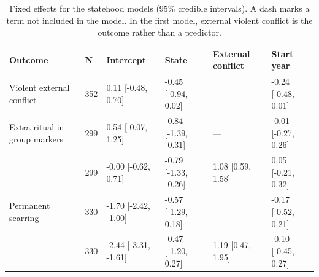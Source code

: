 \begin{table}[!ht]
\centering
\footnotesize
\caption{Fixed effects for the statehood models (95\% credible intervals). A dash marks a term not included in the model. In the first model, external violent conflict is the outcome rather than a predictor.}
\label{tab:state_fixed_effects}
\begin{tabular}{llllll}
\toprule
Outcome & N & Intercept & State & External conflict & Start year \\
\midrule
Violent external conflict & 352 & 0.11 [-0.48, 0.70] & -0.45 [-0.94, 0.02] & --- & -0.24 [-0.48, 0.01] \\
\midrule
Extra-ritual in-group markers & 299 & 0.54 [-0.07, 1.25] & -0.84 [-1.39, -0.31] & --- & -0.01 [-0.27, 0.26] \\
 & 299 & -0.00 [-0.62, 0.71] & -0.79 [-1.33, -0.26] & 1.08 [0.59, 1.58] & 0.05 [-0.21, 0.32] \\
\midrule
Permanent scarring & 330 & -1.70 [-2.42, -1.00] & -0.57 [-1.29, 0.18] & --- & -0.17 [-0.52, 0.21] \\
 & 330 & -2.44 [-3.31, -1.61] & -0.47 [-1.20, 0.27] & 1.19 [0.47, 1.95] & -0.10 [-0.45, 0.27] \\
\bottomrule
\end{tabular}
\end{table}